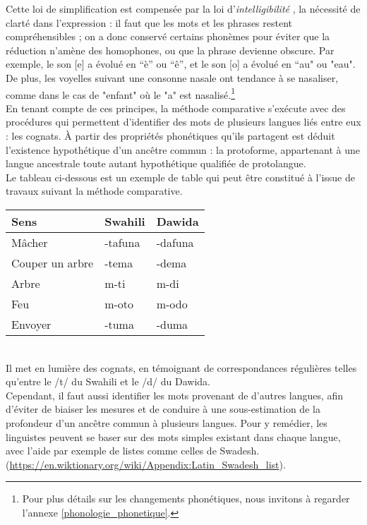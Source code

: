\documentclass[12pt, twoside]{report}
\begin{document}
\indent Cette loi de simplification est compensée par la loi d'\og \textit{intelligibilité} \fg, la nécessité de clarté dans l'expression : il faut que les mots et les phrases restent compréhensibles ; on a donc conservé certains phonèmes pour éviter que la réduction n'amène des homophones, ou que la phrase devienne obscure. Par exemple, le son [e] a évolué en “è” ou “ê”, et le son [o] a évolué en “au" ou "eau". De plus, les voyelles suivant une consonne nasale ont tendance à se nasaliser, comme dans le cas de "enfant" où le "a" est nasalisé.\footnote{Pour plus détails sur les changements phonétiques, nous invitons à regarder l'annexe \ref{phonologie_phonetique}.}\\

En tenant compte de ces principes, la méthode comparative s'exécute avec des procédures qui permettent d'identifier des mots de plusieurs langues liés entre eux : les \glspl{cognat}. À partir des propriétés phonétiques qu'ils partagent est déduit l'existence hypothétique d'un ancêtre commun : la \gls{protoforme}, appartenant à une langue ancestrale toute autant hypothétique qualifiée de protolangue.\\
Le tableau ci-dessous est un exemple de table qui peut être constitué à l'issue de travaux suivant la méthode comparative.

\begin{tabularx}{0.8\textwidth} {
  | >{\centering\arraybackslash}X
  | >{\centering\arraybackslash}X
  | >{\centering\arraybackslash}X | }
\hline
 Sens & Swahili & Dawida \\
\hline
Mâcher  & -tafuna  & -dafuna  \\
\hline
Couper un arbre & -tema & -dema \\
\hline
Arbre & m-ti & m-di \\
\hline
Feu & m-oto & m-odo\\
\hline
Envoyer & -tuma & -duma \\
\hline
\end{tabularx}\\

Il met en lumière des cognats, en témoignant de correspondances régulières telles qu'entre le /t/ du Swahili et le /d/ du Dawida.\\ 

Cependant, il faut aussi identifier les mots provenant de d'autres langues, afin d'éviter de biaiser les mesures et de conduire à une sous-estimation de la profondeur d'un ancêtre commun à plusieurs langues. Pour y remédier, les linguistes peuvent se baser sur des mots simples existant dans chaque langue, avec l'aide par exemple de listes comme celles de Swadesh. (\url{https://en.wiktionary.org/wiki/Appendix:Latin_Swadesh_list}).\\ 
\end{document}
